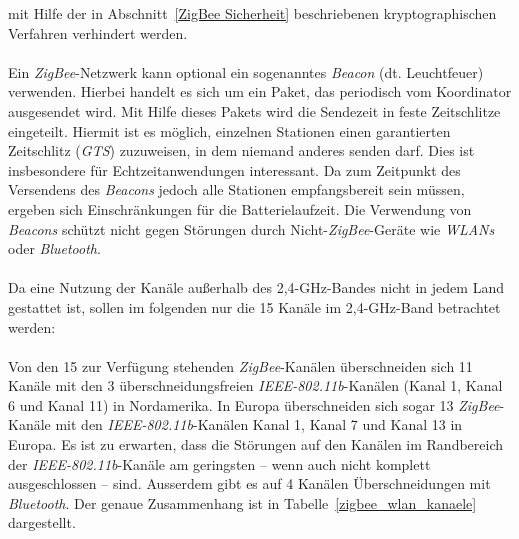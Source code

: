                 mit Hilfe der in Abschnitt~\ref{ZigBee Sicherheit} beschriebenen kryptographischen Verfahren
                verhindert werden.\\
                \\
                Ein \emph{ZigBee}-Netzwerk kann optional ein sogenanntes \emph{Beacon} (dt. Leuchtfeuer) verwenden. Hierbei
                handelt es sich um ein Paket, das periodisch vom Koordinator ausgesendet wird. Mit Hilfe
                dieses Pakets wird die Sendezeit in feste Zeitschlitze eingeteilt. Hiermit ist es möglich, 
                einzelnen Stationen einen garantierten Zeitschlitz (\emph{GTS}) zuzuweisen, in dem niemand anderes
                senden darf. Dies ist insbesondere für Echtzeitanwendungen interessant. Da zum Zeitpunkt des
                Versendens des \emph{Beacons} jedoch alle Stationen empfangsbereit sein müssen, ergeben sich 
                Einschränkungen für die Batterielaufzeit. Die Verwendung von \emph{Beacons} schützt nicht gegen
                Störungen durch Nicht-\emph{ZigBee}-Geräte wie \emph{WLANs} oder \emph{Bluetooth}.\\
                \\
                Da eine Nutzung der Kanäle außerhalb des 2,4-GHz-Bandes nicht in jedem Land gestattet ist,
                sollen im folgenden nur die 15 Kanäle im 2,4-GHz-Band betrachtet werden:\\
                \\
                Von den 15 zur Verfügung stehenden \emph{ZigBee}-Kanälen überschneiden sich 11 Kanäle mit den 3 überschneidungsfreien 
                \emph{IEEE-802.11b}-Kanälen (Kanal 1, Kanal 6 und Kanal 11) in Nordamerika. In Europa überschneiden sich sogar 13 \emph{ZigBee}-Kanäle
                mit den \emph{IEEE-802.11b}-Kanälen Kanal 1, Kanal 7 und Kanal 13 in Europa. Es ist zu 
                erwarten, dass die Störungen auf den Kanälen im Randbereich der \emph{IEEE-802.11b}-Kanäle am geringsten --
                wenn auch nicht komplett ausgeschlossen -- sind.
                Ausserdem gibt es auf 4 Kanälen Überschneidungen mit \emph{Bluetooth}. Der genaue Zusammenhang ist
                in Tabelle~\ref{zigbee_wlan_kanaele} dargestellt.

